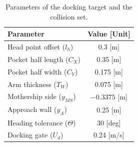 \documentclass[5p,times,authoryear]{elsarticle}
\begin{document}
\begin{table}[t]
\centering
\renewcommand{\arraystretch}{1.2}
\caption{Actuator limits and identified coefficients of the model scale USV.}
\label{tab_params}
\end{table}

\begin{table}[t]
\centering
\renewcommand{\arraystretch}{1.2}
\caption{Parameters of the docking target and the collision set.}
\label{tab_set}
\begin{tabular}{lc}
\hline
\textbf{Parameter} & \textbf{Value [Unit]} \\ \hline
Head point offset ($l_h$)         & 0.3 [m]   \\
Pocket half length ($C_X$)        & 0.35 [m]  \\
Pocket half width ($C_Y$)         & 0.175 [m] \\
Arm thickness ($T_W$)             & 0.075 [m] \\
Mothership side ($y_{MS}$)        & $-0.3375$ [m] \\
Approach wall ($y_A$)             & 0.25 [m]  \\
Heading tolerance ($\Theta$)      & 30 [deg]  \\
Docking gate ($U_d$)              & 0.24 [m/s] \\
\hline
\end{tabular}
\end{table}
\end{document}
